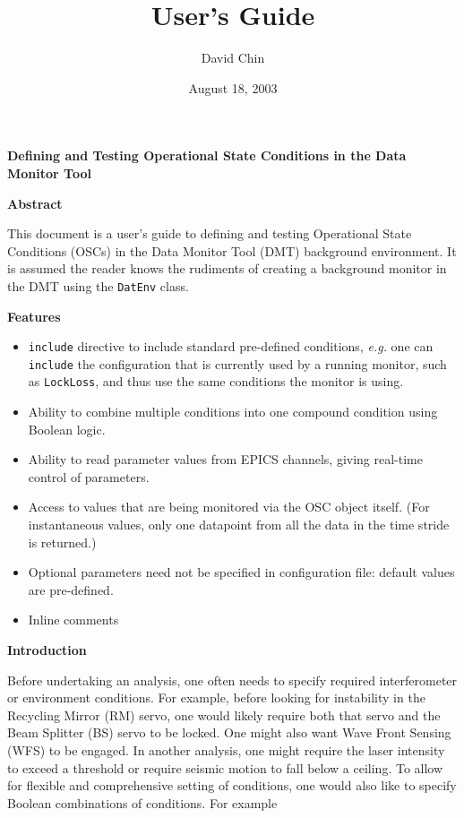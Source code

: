 \documentclass[11pt]{article}
\title{User's Guide}
\author{David Chin}
\date{August 18, 2003}
\begin{document}
\maketitle
\pagebreak
\begin{center}
  \textbf{{\Large Defining and Testing Operational State Conditions 
      in the Data Monitor Tool}}
\end{center}

\begin{center}
  \textbf{{\large Abstract}}
\end{center}

This document is a user's guide to defining and testing Operational
State Conditions (OSCs) in the Data Monitor Tool (DMT) background
environment.  It is assumed the reader knows the rudiments of creating
a background monitor in the DMT using the \texttt{DatEnv} class.

\begin{center}
  \textbf{{\large Features}}
\end{center}

\begin{itemize}
\item \texttt{include} directive to include standard pre-defined
  conditions, \textit{e.g.} one can \texttt{include} the configuration
  that is currently used by a running monitor, such as
  \texttt{LockLoss}, and thus use the same conditions the monitor is
  using.
\item Ability to combine multiple conditions into one compound
  condition using Boolean logic.
\item Ability to read parameter values from EPICS channels, giving
  real-time control of parameters.
\item Access to values that are being monitored via the OSC object
  itself. (For instantaneous values, only one datapoint from all the
  data in the time stride is returned.)
\item Optional parameters need not be specified in configuration
  file: default values are pre-defined.
\item Inline comments
\end{itemize}

\begin{center}
  \textbf{{\large Introduction}}
\end{center}

Before undertaking an analysis, one often needs to specify required
interferometer or environment conditions.  For example, before looking
for instability in the Recycling Mirror (RM) servo, one would likely
require both that servo and the Beam Splitter (BS) servo to be locked.
One might also want Wave Front Sensing (WFS) to be engaged.  In
another analysis, one might require the laser intensity to exceed a
threshold or require seismic motion to fall below a ceiling. To allow
for flexible and comprehensive setting of conditions, one would also
like to specify Boolean combinations of conditions. For example
\end{document}
